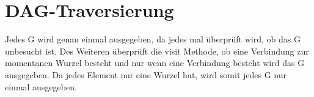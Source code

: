 \section{DAG-Traversierung}
Jedes G wird genau einmal ausgegeben, da jedes mal überprüft wird, ob das G unbesucht ist. Des Weiteren überprüft die visit Methode, ob eine Verbindung zur momentanen Wurzel besteht und nur wenn eine Verbindung besteht wird das G ausgegeben. Da jedes Element nur eine Wurzel hat, wird somit jedes G nur einmal ausgegeben.